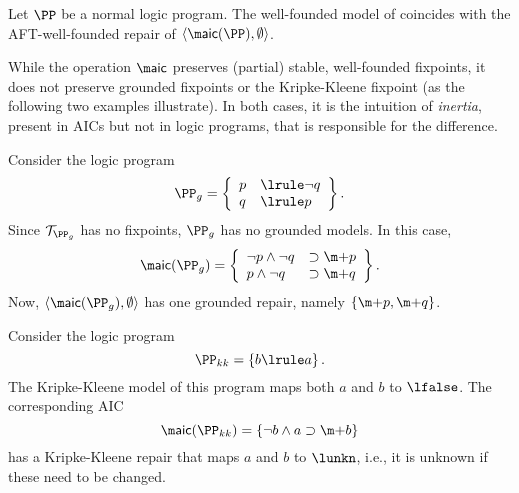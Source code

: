\begin{corollary}
 Let $\PP$ be a normal logic program. The well-founded model of \PP coincides with the AFT-well-founded repair of $\langle \aicop(\PP),\emptyset\rangle$. 
\end{corollary}

 While the operation $\aicop$ preserves (partial) stable, well-founded  fixpoints, it does not preserve grounded fixpoints or the Kripke-Kleene fixpoint (as the following two examples illustrate). In both cases, it is the intuition of \emph{inertia}, present in AICs but not in logic programs, that is responsible for the difference. 

 
\begin{example}\label{ex:grounded}
  Consider the logic program 
  \[\PP_g = \left\{\begin{array}{ll}p&\lrule \lnot q\\ q&\lrule p \end{array} \right\}.\]
  Since $\mathcal{T}_{\PP_g}$ has no fixpoints, $\PP_g$ has no grounded models. 
  In this case, 
  \[\aicop(\PP_g) = \left\{\begin{array}{ll}\lnot p\land \lnot q &\aicrule \add p \\ p \land  \lnot q &\aicrule \add q\end{array}\right\}.\]
  Now, $\langle \aicop(\PP_g),\emptyset\rangle$ has one grounded repair, namely $\{\add p, \add q\}$. 
\end{example}




\begin{example}
 Consider the logic program
 \[\PP_{kk}=\left\{ b\lrule a\right\}.\]
 The Kripke-Kleene model of this program maps both $a$ and $b$ to $\lfalse$. 
 The corresponding AIC 
 \[\aicop(\PP_{kk}) = \{\lnot b \land a \aicrule \add b\}\] 
 has a Kripke-Kleene repair that maps $a$ and $b$ to $\lunkn$, i.e., it is unknown if these need to be changed. 
\end{example}


